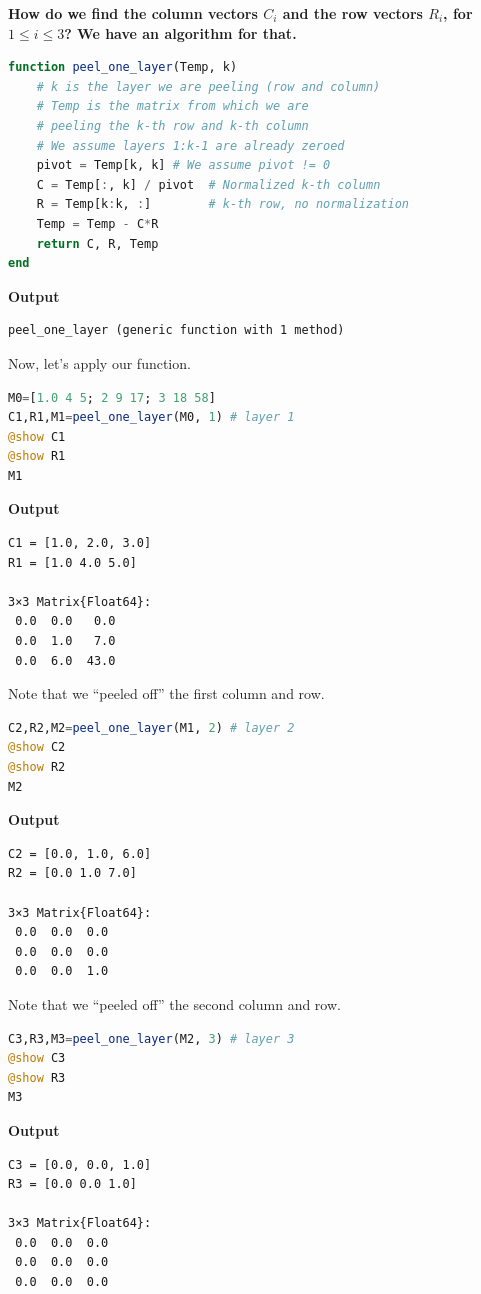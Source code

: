 \textbf{How do we find the column vectors $C_i$ and the row vectors $R_i$, for $1 \le i \le 3$? We have an algorithm for that.}\\

\begin{lstlisting}[language=Julia,style=mystyle]
function peel_one_layer(Temp, k)
    # k is the layer we are peeling (row and column)
    # Temp is the matrix from which we are
    # peeling the k-th row and k-th column
    # We assume layers 1:k-1 are already zeroed
    pivot = Temp[k, k] # We assume pivot != 0
    C = Temp[:, k] / pivot  # Normalized k-th column
    R = Temp[k:k, :]        # k-th row, no normalization
    Temp = Temp - C*R
    return C, R, Temp
end
\end{lstlisting}
\textbf{Output} 
\begin{verbatim}
peel_one_layer (generic function with 1 method)
\end{verbatim}

Now, let's apply our function.

\begin{lstlisting}[language=Julia,style=mystyle]
M0=[1.0 4 5; 2 9 17; 3 18 58]
C1,R1,M1=peel_one_layer(M0, 1) # layer 1
@show C1
@show R1
M1
\end{lstlisting}
\textbf{Output} 
\begin{verbatim}
C1 = [1.0, 2.0, 3.0]
R1 = [1.0 4.0 5.0]

3×3 Matrix{Float64}:
 0.0  0.0   0.0
 0.0  1.0   7.0
 0.0  6.0  43.0
\end{verbatim}

Note that we ``peeled off'' the first column and row.

\begin{lstlisting}[language=Julia,style=mystyle]
C2,R2,M2=peel_one_layer(M1, 2) # layer 2
@show C2
@show R2
M2
\end{lstlisting}
\textbf{Output} 
\begin{verbatim}
C2 = [0.0, 1.0, 6.0]
R2 = [0.0 1.0 7.0]

3×3 Matrix{Float64}:
 0.0  0.0  0.0
 0.0  0.0  0.0
 0.0  0.0  1.0
\end{verbatim}

Note that we ``peeled off'' the second column and row.

\begin{lstlisting}[language=Julia,style=mystyle]
C3,R3,M3=peel_one_layer(M2, 3) # layer 3
@show C3
@show R3
M3
\end{lstlisting}
\textbf{Output} 
\begin{verbatim}
C3 = [0.0, 0.0, 1.0]
R3 = [0.0 0.0 1.0]

3×3 Matrix{Float64}:
 0.0  0.0  0.0
 0.0  0.0  0.0
 0.0  0.0  0.0
\end{verbatim}

